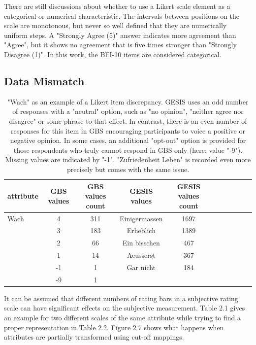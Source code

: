 There are still discussions about whether to use a Likert scale element as a categorical or numerical characteristic. The intervals between positions on the scale are monotonous, but never so well defined that they are numerically uniform steps. A "Strongly Agree (5)" answer indicates more agreement than "Agree", but it shows no agreement that is five times stronger than "Strongly Disagree (1)". In this work, the BFI-10 items are considered categorical.

\subsection{Data Mismatch}

\begin{table}[ht]
    \begin{center}
            {\footnotesize
            \begin{tabular}{l|c|ccccccccc}
                \hline \hline
		attribute & GBS values & GBS values count &  GESIS values & GESIS values count \\
                \hline \hline
                     Wach & 4 & 311 & Einigermassen & 1697 \\
                     & 3 & 183 & Erheblich & 1389 \\
                     & 2 & 66 & Ein bisschen & 467 \\ 
              	& 1 & 14 & Aeusserst & 367 \\	
		& -1 & 1 & Gar nicht & 184 \\		
		& -9 & 1 & & \\
	     \hline \hline
            \end{tabular}}
        \caption{"Wach" as an example of a Likert item discrepancy. GESIS uses an odd number of responses with a "neutral" option, such as "no opinion", "neither agree nor disagree" or some phrase to that effect. In contrast, there is an even number of responses for this item in GBS encouraging participants to voice a positive or negative opinion. In some cases, an additional "opt-out" option is provided for those respondents who truly cannot respond in GBS only (here: value "-9"). Missing values are indicated by "-1". "Zufriedenheit Leben" is recorded even more precisely but comes with the same issue.}
\end{center}
\end{table}

It can be assumed that different numbers of rating bars in a subjective rating scale can have significant effects on the subjective measurement. Table 2.1 gives an example for two different scales of the same attribute while trying to find a proper representation in Table 2.2. Figure 2.7 shows what happens when attributes are partially transformed using cut-off mappings.


